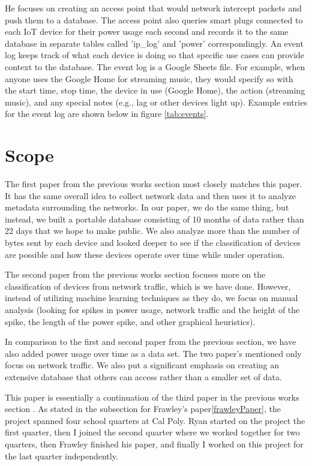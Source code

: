 He focuses on creating an access point that would network intercept packets and push them to a database. The access point also queries smart plugs connected to each IoT device for their power usage each second and records it to the same database in separate tables called 'ip\_log' and 'power' correspondingly. An event log keeps track of what each device is doing so that specific use cases can provide context to the database. The event log is a Google Sheets file. For example, when anyone uses the Google Home for streaming music, they would specify so with the start time, stop time, the device in use (Google Home), the action (streaming music), and any special notes (e.g., lag or other devices light up). Example entries for the event log are shown below in figure \ref{tab:events}.

\section{Scope}
\label{Scope}
The first paper from the previous works section\cite{home_iot} most closely matches this paper. It has the same overall idea to collect network data and then uses it to analyze metadata surrounding the networks. In our paper, we do the same thing, but instead, we built a portable database consisting of 10 months of data rather than 22 days that we hope to make public. We also analyze more than the number of bytes sent by each device and looked deeper to see if the classification of devices are possible and how these devices operate over time while under operation.

The second paper from the previous works section\cite{Meidan:2017:PML:3019612.3019878} focuses more on the classification of devices from network traffic, which is we have done. However, instead of utilizing machine learning techniques as they do, we focus on manual analysis (looking for spikes in power usage, network traffic and the height of the spike, the length of the power spike, and other graphical heuristics).

In comparison to the first \cite{home_iot} and second paper \cite{Meidan:2017:PML:3019612.3019878} from the previous section, we have also added power usage over time as a data set. The two paper's mentioned only focus on network traffic. We also put a significant emphasis on creating an extensive database that others can access rather than a smaller set of data.

This paper is essentially a continuation of the third paper in the previous works section \cite{frawley_2018}. As stated in the subsection for Frawley's paper\ref{frawleyPaper}, the project spanned four school quarters at Cal Poly. Ryan started on the project the first quarter, then I joined the second quarter where we worked together for two quarters, then Frawley finished his paper, and finally I worked on this project for the last quarter independently.


